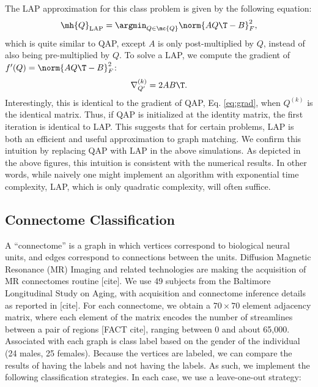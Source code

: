The LAP approximation  for this class problem is given by the following equation:
\begin{align} \label{eq:LAP}
	\mh{Q}_{\text{LAP}} = \argmin_{Q \in \mc{Q}} \norm{A Q\T - B }^2_F,
\end{align}
which is quite similar to QAP, except $A$ is only post-multiplied by $Q$, instead of also being pre-multiplied by $Q$. To solve a LAP, we compute the gradient of $f'(Q)=\norm{AQ\T-B}_F^2$:
\begin{align} \label{eq:grad2}
	\nabla_{Q'}^{(k)} = 2A B\T. 
\end{align}
Interestingly, this is identical to the gradient of QAP, Eq. \eqref{eq:grad}, when $Q^{(k)}$ is the identical matrix.  Thus, if QAP is initialized at the identity matrix, the first iteration is identical to LAP.  This suggests that for certain problems, LAP is both an efficient and useful approximation to graph matching.  We confirm this intuition by replacing QAP with LAP in the above simulations.  As depicted in the above figures, this intuition is consistent with the numerical results. In other words, while naively one might implement an algorithm with exponential time complexity, LAP, which is only quadratic complexity, will often suffice.



\subsection{Connectome Classification} %
\label{sub:connectome_classification}

A ``connectome'' is a graph in which vertices correspond to biological neural units, and edges correspond to connections between the units.  Diffusion Magnetic Resonance (MR) Imaging and related technologies are making the acquisition of MR connectomes routine [cite].  We use 49 subjects from the Baltimore Longitudinal Study on Aging, with acquisition and connectome inference details as reported in [cite].  For each connectome, we obtain a $70 \times 70$ element adjacency matrix, where each element of the matrix encodes the number of streamlines between a pair of regions [FACT cite], ranging between 0 and about 65,000.  Associated with each graph is class label based on the gender of the individual (24 males, 25 females).  Because the vertices are labeled, we can compare the results of having the labels and not having the labels.  As such, we implement the following classification strategies.  In each case, we use a leave-one-out strategy:

